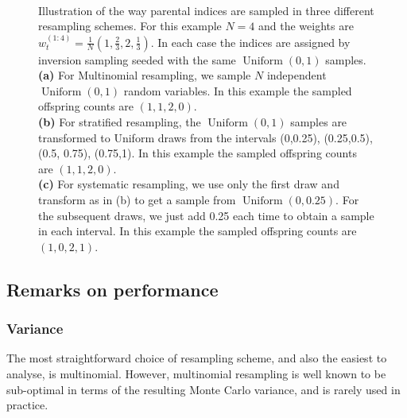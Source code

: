 \documentclass[fleqn]{article}
\theoremstyle{definition}
\newcommand{\Unif}{\operatorname{Uniform}}
\newcommand{\wt}[2][t]{w_{#1}^{(#2)}}
\begin{document}
\begin{figure}
{
\label{fig:resampling_systematic}
}\\
\caption{Illustration of the way parental indices are sampled in three different resampling schemes. For this example $N=4$ and the weights are $\wt{1:4} = \frac{1}{N}(1,\frac{2}{3},2,\frac{1}{3})$. In each case the indices are assigned by inversion sampling seeded with the same $\Unif(0,1)$ samples.\\
\textbf{(a)} For Multinomial resampling, we sample $N$  independent $\Unif(0,1)$ random variables. In this example the sampled offspring counts are $(1,1,2,0)$.\\
\textbf{(b)} For stratified resampling, the $\Unif(0,1)$ samples are transformed to Uniform draws from the intervals (0,0.25), (0.25,0.5), (0.5, 0.75), (0.75,1). In this example the sampled offspring counts are $(1,1,2,0)$.\\
\textbf{(c)} For systematic resampling, we use only the first draw and transform as in (b) to get a sample from $\Unif(0,0.25)$. For the subsequent draws, we just add 0.25 each time to obtain a sample in each interval. In this example the sampled offspring counts are $(1,0,2,1)$.}
\end{figure}

\subsection{Remarks on performance}
\subsubsection{Variance}
The most straightforward choice of resampling scheme, and also the easiest to analyse, is multinomial. However, multinomial resampling is well known to be sub-optimal in terms of the resulting Monte Carlo variance, and is rarely used in practice.
\end{document}
